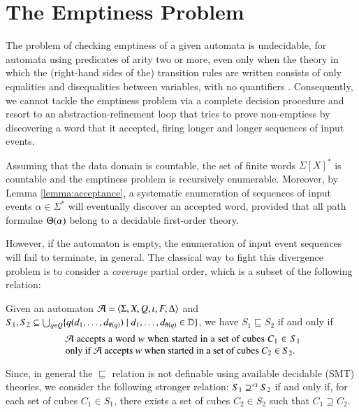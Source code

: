 \documentclass{llncs}
\begin{document}
\section{The Emptiness Problem}

The problem of checking emptiness of a given automata is undecidable,
for automata using predicates of arity two or more, even only when the
theory in which the (right-hand sides of the) transition rules are
written consists of only equalities and disequalities between
variables, with no quantifiers \cite{FarzanKincaidPodelski15}.
Consequently, we cannot tackle the emptiness problem via a complete
decision procedure and resort to an abstraction-refinement loop that
tries to prove non-emptiess by discovering a word that it accepted,
firing longer and longer sequences of input events.

Assuming that the data domain is countable, the set of finite words
$\Sigma[X]^*$ is countable and the emptiness problem is recursively
enumerable. Moreover, by Lemma \ref{lemma:acceptance}, a systematic
enumeration of sequences of input events $\alpha \in \Sigma^*$ will
eventually discover an accepted word, provided that all path formulae
$\Theta({\alpha})$ belong to a decidable first-order theory.




However, if the automaton is empty, the enumeration of input event
sequences will fail to terminate, in general. The classical way to
fight this divergence problem is to consider a \emph{coverage} partial
order, which is a subset of the following relation: 

\begin{definition}\label{def:coverage}
  Given an automaton $\mathcal{A} = \langle \Sigma,X,Q,\iota,F,\Delta \rangle$ and
  $S_1, S_2 \subseteq \bigcup_{q \in Q} \{ q(d_1,\ldots,d_{\#(q)})
    \mid d_1,\ldots,d_{\#(q)} \in \mathbb{D} \}$, we have $S_1 \sqsubseteq
  S_2$ if and only if 
  \begin{equation}\label{eq:po}
    \text{
      \begin{minipage}{0.7\textwidth}
        $\A$ accepts a word $w$ when started in a set of cubes $C_1
        \in S_1$ only if $\A$ accepts $w$ when started in a set of
        cubes $C_2 \in S_2$.
    \end{minipage}} 
  \end{equation}
\end{definition}
Since, in general the $\sqsubseteq$ relation is not definable using
available decidable (SMT) theories, we consider the following stronger
relation: $S_1 \supseteq^{\scriptscriptstyle\forall\exists} S_2$ if and only if, for each set of cubes
$C_1 \in S_1$, there exists a set of cubes $C_2 \in S_2$ such that
$C_1 \supseteq C_2$.
\end{document}
